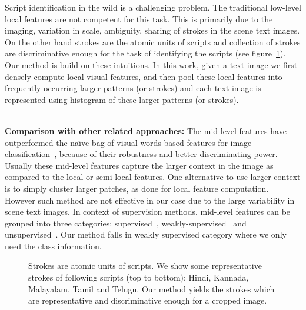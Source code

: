 Script identification in the wild is a challenging problem. The traditional  low-level local features are not competent for this task. This is primarily due to the imaging, variation in scale, ambiguity, sharing of strokes in the scene text images. On the other hand strokes are the atomic units of scripts and collection of strokes are discriminative enough for the task of identifying the scripts (see figure~\ref{fig:strokes}). Our method is build on these intuitions. In this work, given a text image we first densely compute local visual features, and then pool these local features into frequently occurring larger patterns (or strokes) and each text image is represented using histogram of these larger patterns (or strokes). 
\\
\


\noindent\textbf{Comparison with other related approaches:} 
The mid-level features have outperformed the na\"{\i}ve bag-of-visual-words based features for image classification~\cite{JunejaVJZ13}, because of their
robustness and better discriminating power. Usually these mid-level
features capture the larger context in the image as compared to the local or semi-local features. One alternative to use larger context is to simply cluster larger patches, as done for local feature computation. However such method are not effective in our case due to the large variability in scene text images. In context of supervision methods, mid-level features can
be grouped into three categories: supervised~\cite{JunejaVJZ13}, weakly-supervised~\cite{FernandoFT14} and unsupervised~\cite{SinghGE12}. Our method falls in weakly supervised category where we only need the class information. 

\begin{figure} [!t]
\centering
{}
\caption{Strokes are atomic units of scripts. We show some representative strokes of following scripts (top to bottom): Hindi, Kannada, Malayalam, Tamil and Telugu. Our method yields the strokes which are representative and discriminative enough for a cropped image.}
\label{fig:strokes}
\end{figure} 

